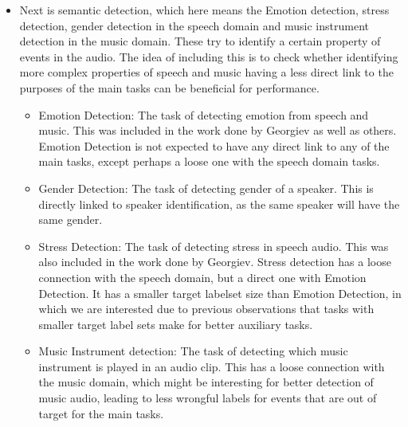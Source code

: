 \begin{itemize}
		\item Next is semantic detection, which here means the Emotion detection, stress detection, gender detection in the speech domain and music instrument detection in the music domain. These try to identify a certain property of events in the audio. The idea of including this is to check whether identifying more complex properties of speech and music having a less direct link to the purposes of the main tasks can be beneficial for performance.
		\begin{itemize}
			\item Emotion Detection: The task of detecting emotion from speech and music. This was included in the work done by Georgiev as well as others. Emotion Detection is not expected to have any direct link to any of the main tasks, except perhaps a loose one with the speech domain tasks. 
			\item Gender Detection: The task of detecting gender of a speaker. This is directly linked to speaker identification, as the same speaker will have the same gender. 
			\item  Stress Detection: The task of detecting stress in speech audio. This was also included in the work done by Georgiev. Stress detection has a loose connection with the speech domain, but a direct one with Emotion Detection. It has a smaller target labelset size than Emotion Detection, in which we are interested due to previous observations that tasks with smaller target label sets make for better auxiliary tasks.
			\item  Music Instrument detection: The task of detecting which music instrument is played in an audio clip. This has a loose connection with the music domain, which might be interesting for better detection of music audio, leading to less wrongful labels for events that are out of target for the main tasks.
		\end{itemize}
	

\end{itemize}
